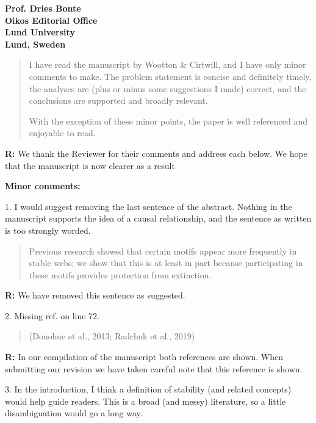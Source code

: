 \documentclass[12pt]{letter}
\begin{document}
\begin{letter}{\bf Prof. Dries Bonte\\
Oikos Editorial Office \\
Lund University \\
Lund, Sweden}
  \begin{quotation}
    I have read the manuscript by Wootton \& Cirtwill, and I have only minor comments to make. The problem statement is concise and definitely timely, the analyses are (plus or minus some suggestions I made) correct, and the conclusions are supported and broadly relevant.

    With the exception of these minor points, the paper is well referenced and enjoyable to read.
  \end{quotation}  

  \smallskip

  \textbf{R:} We thank the Reviewer for their comments and address each below. We hope that the manuscript is now clearer as a result

  \smallskip

  \textbf{Minor comments:}

    1. I would suggest removing the last sentence of the abstract. Nothing in the manuscript supports the idea of a causal relationship, and the sentence as written is too strongly worded.

    \begin{quotation}
      Previous research showed that certain motifs appear more frequently in stable webs; we show that this is at least in part because participating in these motifs provides protection from extinction.
    \end{quotation}

    \smallskip

    \textbf{R:} We have removed this sentence as suggested.

    \smallskip

    2. Missing ref. on line 72.

    \begin{quotation}
    (Donohue et al., 2013; Radchuk et al., 2019)
    \end{quotation}

    \smallskip

    \textbf{R:} In our compilation of the manuscript both references are shown. When submitting our revision we have taken careful note that this reference is shown.

    \smallskip

    3. In the introduction, I think a definition of stability (and related concepts) would help guide readers. This is a broad (and messy) literature, so a little disambiguation would go a long way.


\end{letter}
\end{document}

